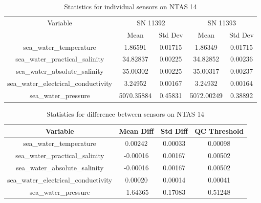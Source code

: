\begin{table}[h]
\centering
\begin{tabular}{|c|c|c|c|c|}
\hline
Variable & \multicolumn{2}{c|}{SN 11392} & \multicolumn{2}{c|}{SN 11393} \\
& Mean & Std Dev & Mean & Std Dev \\
\hline
sea\_water\_temperature & 1.86591 & 0.01715 & 1.86349 & 0.01715 \\
sea\_water\_practical\_salinity & 34.82837 & 0.00225 & 34.82852 & 0.00236 \\
sea\_water\_absolute\_salinity & 35.00302 & 0.00225 & 35.00317 & 0.00237 \\
sea\_water\_electrical\_conductivity & 3.24952 & 0.00167 & 3.24932 & 0.00164 \\
sea\_water\_pressure & 5070.35884 & 0.45831 & 5072.00249 & 0.38892 \\
\hline
\end{tabular}
\caption{Statistics for individual sensors on NTAS 14}
\end{table}

\begin{table}[h]
\centering
\begin{tabular}{|c|c|c|c|}
\hline
Variable & Mean Diff & Std Diff & QC Threshold \\
\hline
sea\_water\_temperature & 0.00242 & 0.00033 & 0.00098 \\
sea\_water\_practical\_salinity & -0.00016 & 0.00167 & 0.00502 \\
sea\_water\_absolute\_salinity & -0.00016 & 0.00167 & 0.00502 \\
sea\_water\_electrical\_conductivity & 0.00020 & 0.00014 & 0.00041 \\
sea\_water\_pressure & -1.64365 & 0.17083 & 0.51248 \\
\hline
\end{tabular}
\caption{Statistics for difference between sensors on NTAS 14}
\end{table}
